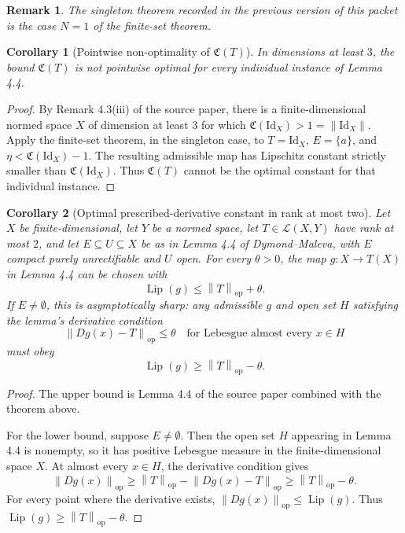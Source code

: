 \documentclass[11pt]{article}
\newtheorem{corollary}{Corollary}
\newtheorem{remark}{Remark}
\DeclareMathOperator{\Lip}{Lip}
\newcommand{\cyl}{\mathfrak C}
\newcommand{\opnorm}[1]{\left\|#1\right\|_{\mathrm{op}}}
\begin{document}
\begin{remark}
The singleton theorem recorded in the previous version of this packet is the
case \(N=1\) of the finite-set theorem.
\end{remark}

\begin{corollary}[Pointwise non-optimality of \(\cyl(T)\)]
In dimensions at least \(3\), the bound \(\cyl(T)\) is not pointwise optimal
for every individual instance of Lemma 4.4.
\end{corollary}

\begin{proof}
By Remark 4.3(iii) of the source paper, there is a finite-dimensional normed
space \(X\) of dimension at least \(3\) for which
\(\cyl(\mathrm{Id}_X)>1=\|\mathrm{Id}_X\|\).  Apply the finite-set theorem, in
the singleton case, to
\(T=\mathrm{Id}_X\), \(E=\{a\}\), and \(\eta<\cyl(\mathrm{Id}_X)-1\).  The
resulting admissible map has Lipschitz constant strictly smaller than
\(\cyl(\mathrm{Id}_X)\).  Thus \(\cyl(T)\) cannot be the optimal constant for
that individual instance.
\end{proof}

\begin{corollary}[Optimal prescribed-derivative constant in rank at most two]
Let \(X\) be finite-dimensional, let \(Y\) be a normed space, let
\(T\in\mathcal L(X,Y)\) have rank at most \(2\), and let
\(E\subseteq U\subseteq X\) be as in Lemma 4.4 of Dymond--Maleva, with
\(E\) compact purely unrectifiable and \(U\) open.  For every \(\theta>0\),
the map \(g:X\to T(X)\) in Lemma 4.4 can be chosen with
\[
  \Lip(g)\leq \opnorm{T}+\theta.
\]
If \(E\neq\emptyset\), this is asymptotically sharp: any admissible \(g\) and
open set \(H\) satisfying the lemma's derivative condition
\[
  \opnorm{Dg(x)-T}\leq \theta
  \quad\text{for Lebesgue almost every }x\in H
\]
must obey
\[
  \Lip(g)\geq \opnorm{T}-\theta.
\]
\end{corollary}

\begin{proof}
The upper bound is Lemma 4.4 of the source paper combined with the theorem
above.

For the lower bound, suppose \(E\neq\emptyset\).  Then the open set \(H\)
appearing in Lemma 4.4 is nonempty, so it has positive Lebesgue measure in the
finite-dimensional space \(X\).  At almost every \(x\in H\), the derivative
condition gives
\[
  \opnorm{Dg(x)}\geq \opnorm{T}-\opnorm{Dg(x)-T}\geq \opnorm{T}-\theta.
\]
For every point where the derivative exists, \(\opnorm{Dg(x)}\leq \Lip(g)\).
Thus \(\Lip(g)\geq \opnorm{T}-\theta\).
\end{proof}
\end{document}
